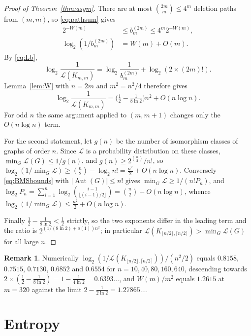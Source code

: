 \documentclass[11pt]{article}
\theoremstyle{definition}
\newtheorem{remark}[theorem]{Remark}
\DeclareMathOperator{\Aut}{Aut}
\newcommand{\Lk}{\mathcal{L}}
\newcommand{\bin}[2]{\binom{#1}{#2}}
\newcommand{\Kbal}{K_{\lfloor n/2\rfloor,\lceil n/2\rceil}}
\begin{document}
\begin{proof}[Proof of Theorem~\ref{thm:asym}]
There are at most $\bin{2m}{m}\le4^m$ deletion paths from $(m,m)$, so
\eqref{eq:pathsum} gives
\begin{align*}
2^{-W(m)}&\le b^{(2m)}_m\le 4^m2^{-W(m)},\\
\log_2(1/b^{(2m)}_m)&=W(m)+O(m).
\end{align*}
By \eqref{eq:Lb},
\[
\log_2\frac{1}{\Lk(K_{m,m})}
=\log_2\frac{1}{b^{(2m)}_m}+\log_2(2\times(2m)!).
\]
Lemma~\ref{lem:W} with $n=2m$ and $m^2=n^2/4$ therefore gives
\[
\log_2\frac1{\Lk(K_{m,m})}=\Big(\tfrac12-\tfrac1{8\ln2}\Big)n^2+O(n\log n).
\]
For odd $n$ the same argument applied to $(m,m+1)$ changes only the $O(n\log n)$ term.

For the second statement, let $g(n)$ be the number of isomorphism classes of graphs of order $n$. Since $\Lk$ is a probability distribution on these classes, $\min_G\Lk(G)\le 1/g(n)$, and $g(n)\ge 2^{\bin n2}/n!$, so $\log_2(1/\min_G\Lk)\ge\bin n2-\log_2n!=\tfrac{n^2}2+O(n\log n)$. Conversely \eqref{eq:BMSbounds} with $\lvert\Aut(G)\rvert\le n!$ gives $\min_G\Lk\ge 1/(n!P_n)$, and $\log_2P_n=\sum_{i=1}^n\log_2\bin{i-1}{\lfloor (i-1)/2\rfloor}=\bin n2+O(n\log n)$, whence $\log_2(1/\min_G\Lk)\le \tfrac{n^2}2+O(n\log n)$.

Finally $\tfrac12-\tfrac1{8\ln2}<\tfrac12$ strictly, so the two exponents differ in the leading term and the ratio is $2^{(1/(8\ln2)+o(1))n^2}$; in particular $\Lk(\Kbal)>\min_G\Lk(G)$ for all large $n$.
\end{proof}

\begin{remark}
Numerically $\log_2(1/\Lk(\Kbal))/(n^2/2)$ equals $0.8158$, $0.7515$, $0.7130$, $0.6852$ and $0.6554$ for $n=10,40,80,160,640$, descending towards $2\times(\tfrac12-\tfrac1{8\ln2})=1-\tfrac1{4\ln2}=0.6393\ldots$, and $W(m)/m^2$ equals $1.2615$ at $m=320$ against the limit $2-\tfrac1{2\ln 2}=1.27865\ldots$.
\end{remark}

\section{Entropy}\label{sec:entropy}
\end{document}
